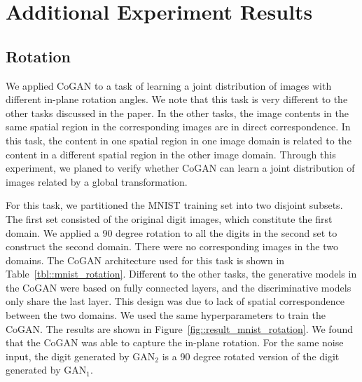 \clearpage

\section{Additional Experiment Results}\label{subsec::digits}

\subsection{Rotation}

We applied CoGAN to a task of learning a joint distribution of images with different in-plane rotation angles. We note that this task is very different to the other tasks discussed in the paper. In the other tasks, the image contents in the same spatial region in the corresponding images are in direct correspondence. In this task, the content in one spatial region in one image domain is related to the content in a different spatial region in the other image domain. Through this experiment, we planed to verify whether CoGAN can learn a joint distribution of images related by a global transformation.

For this task, we partitioned the MNIST training set into two disjoint subsets. The first set consisted of the original digit images, which constitute the first domain. We applied a 90 degree rotation to all the digits in the second set to construct the second domain. There were no corresponding images in the two domains. The CoGAN architecture used for this task is shown in Table~\ref{tbl::mnist_rotation}. Different to the other tasks, the generative models in the CoGAN were based on fully connected layers, and the discriminative models only share the last layer. This design was due to lack of spatial correspondence between the two domains. We used the same hyperparameters to train the CoGAN. The results are shown in Figure~\ref{fig::result_mnist_rotation}. We found that the CoGAN was able to capture the in-plane rotation. For the same noise input, the digit generated by $\text{GAN}_2$ is a 90 degree rotated version of the digit generated by $\text{GAN}_1$.


